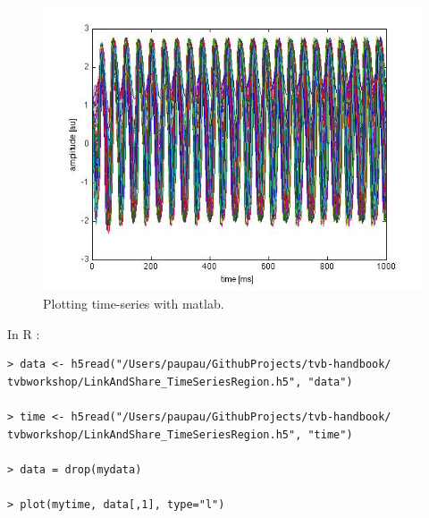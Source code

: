 \documentclass{tufte-handout}
\begin{document}
\begin{figure}[h]
  \includegraphics[width=\linewidth]{Handout_UI_LinkAndShare_MatlabTimeSeriesRegion.png}%
  \caption{Plotting time-series with matlab.}%
  \label{fig:matlab}%
\end{figure}

In R :

\begin{verbatim}
> data <- h5read("/Users/paupau/GithubProjects/tvb-handbook/
tvbworkshop/LinkAndShare_TimeSeriesRegion.h5", "data")

> time <- h5read("/Users/paupau/GithubProjects/tvb-handbook/
tvbworkshop/LinkAndShare_TimeSeriesRegion.h5", "time")

> data = drop(mydata)

> plot(mytime, data[,1], type="l")
\end{verbatim}
\end{document}
